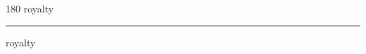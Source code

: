 
\begin{frame}
\begin{center}
\begin{turn}{180}
{\fontsize{2.5cm}{1em}\selectfont royalty}
\end{turn}
\vspace{1em}\par  
\hrule
\vspace{1em}\par  
{\fontsize{2.5cm}{1em}\selectfont royalty}
\end{center}
\end{frame}
